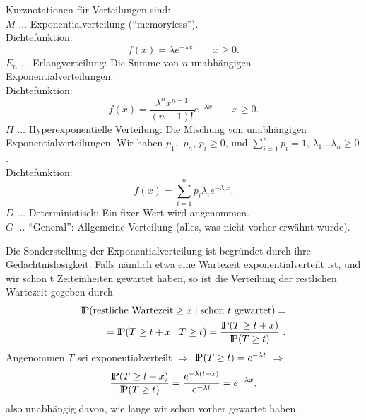 Kurznotationen für Verteilungen sind: \\
$M$ $\dots$ Exponentialverteilung (\enquote{memoryless}). \\
Dichtefunktion:
\begin{displaymath}
f(x) = \lambda e^{-\lambda x} \qquad x\geq 0.
\end{displaymath}
$E_{n}$ $\dots$ Erlangverteilung: Die Summe von $n$ unabhängigen
Exponentialverteilungen.\\
 Dichtefunktion:
\begin{displaymath}
f(x)=\frac{\lambda^{n}x^{n-1}}{(n-1)!}e^{-\lambda x} \qquad x\geq 0.
\end{displaymath}
$H$ $\dots$ Hyperexponentielle Verteilung: Die Mischung von unabhängigen
Exponentialverteilungen. Wir haben $p_{1} \dots p_{n}$,  $p_{i} \geq 0$,
 und
$\sum_{i=1}^{n} p_{i} = 1$, $\lambda_{1} \dots \lambda_{n} \geq 0$. \\
Dichtefunktion:
\begin{displaymath}
f(x)=\sum_{i=1}^{n} p_{i} \lambda_{i} e^{-\lambda_{i}x}.
\end{displaymath}
$D$ $\dots$ Deterministisch: Ein fixer Wert wird angenommen. \\
$G$ $\dots$ \enquote{General}: Allgemeine Verteilung (alles, was nicht vorher erwähnt
wurde).

Die Sonderstellung der Exponentialverteilung ist begründet durch ihre
Gedächtnislosigkeit. Falls nämlich etwa eine Wartezeit
exponentialverteilt ist, und wir schon t Zeiteinheiten gewartet haben, so
ist die Verteilung der restlichen Wartezeit gegeben durch
\begin{eqnarray*}
{\rm I\kern-0.2em P}(\mbox{restliche Wartezeit} \geq x \mid \mbox{schon $t$
gewartet}) = \\
= {\rm I\kern-0.2em P}(T \geq t+x \mid T \geq t) = \frac{{\rm I\kern-0.2em P}(T \geq t+x)}{{\rm I\kern-0.2em P}(T\geq t)} ~.
\end{eqnarray*}
Angenommen $T$  sei exponentialverteilt $\Rightarrow$ ${\rm I\kern-0.2em P}(T \geq t) =
e^{-\lambda t}$  $\Rightarrow$
\begin{displaymath}
\frac{{\rm I\kern-0.2em P}(T \geq t+x)}{{\rm I\kern-0.2em P}(T \geq t)} = \frac{e^{-\lambda
(t+x)}}{e^{-\lambda
t}}= e^{-\lambda x},
\end{displaymath}
also unabhängig davon, wie lange wir schon vorher gewartet haben.

